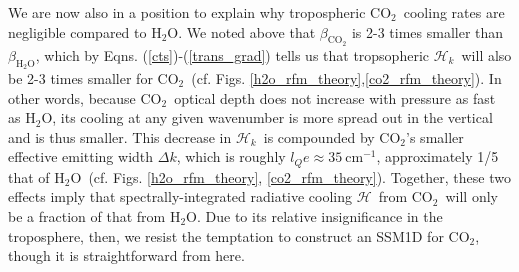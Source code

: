 \documentclass{ametsoc}
\newcommand{\eqnref}[1]{(\ref{#1})}
\newcommand{\cminverse}{\ensuremath{\mathrm{cm^{-1}}}}
\newcommand{\cotwo}{\ensuremath{\mathrm{CO_2}}}
\newcommand{\htwo}{\ensuremath{\mathrm{H_2O}}}
\newcommand{\ch}{\ensuremath{\mathcal{H}}}
\newcommand{\chk}{\ensuremath{\ch_k}}
\newcommand{\lQ}{\ensuremath{l_{Q}}}
\begin{document}
We are now also in a position to explain why tropospheric \cotwo\ cooling rates are negligible compared to \htwo. We noted above that $\beta_{\cotwo}$ is 2-3 times smaller than $\beta_{\htwo}$, which by Eqns. \eqnref{cts}-\eqnref{trans_grad} tells us that  tropsopheric \chk\ will also be 2-3 times smaller for \cotwo\ (cf.  Figs. \ref{h2o_rfm_theory},\ref{co2_rfm_theory}). In other words, because \cotwo\ optical depth does not increase with pressure as fast as \htwo, its cooling at any given wavenumber is more spread out in the vertical and is thus smaller. This decrease in \chk\ is compounded by \cotwo's smaller effective emitting width $\Delta k$, which is roughly $\lQ e \approx 35 \ \cminverse$, approximately 1/5 that of \htwo\ (cf. Figs. \ref{h2o_rfm_theory}, \ref{co2_rfm_theory}). Together, these two effects imply that spectrally-integrated radiative cooling \ch\ from \cotwo\ will only be a fraction of that from \htwo. Due to its relative insignificance in the troposphere, then, we resist the temptation to construct an SSM1D for \cotwo, though it is straightforward from here.


 
\end{document}
